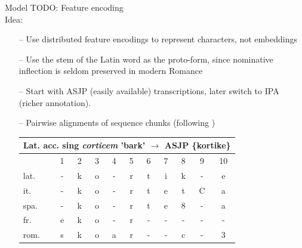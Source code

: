 \documentclass[10pt]{beamer}
\begin{document}
\begin{frame}{Model}
    TODO: Feature encoding \\
    Idea:
    \begin{itemize}
        \item[--] Use distributed feature encodings to represent characters, not embeddings
        \item[--] Use the stem of the Latin word as the proto-form, since nominative inflection is seldom preserved in modern Romance 
        \item[--] Start with ASJP (easily available) transcriptions, later switch to IPA (richer annotation).
        \item[--] Pairwise alignments of sequence chunks (following \cite{ciobanu_ab_2018}) \\
        \begin{center}
        \begin{tabular}{lcccccccccc}
            \hline
            \multicolumn{11}{c}{Lat. acc. sing \textit{corticem} 'bark' $\rightarrow$ ASJP \{kortike\}} \\
            \hline
            & 1 & 2 & 3 & 4 & 5 & 6 & 7 & 8 & 9 & 10 \\
            lat. & - & k & o & - & r & t & i & k & - & e \\
            it. & - & k & o & - & r & t & e & t & C & a \\
            spa. & - & k & o & - & r & t & e & 8 & - & a \\
            fr. & e & k & o & - & r & - & - & - & - & - \\
            rom. & s & k & o & a & r & - & - & c & - & 3  
        \end{tabular}
        \end{center}
    \end{itemize}
\end{frame}
\end{document}
